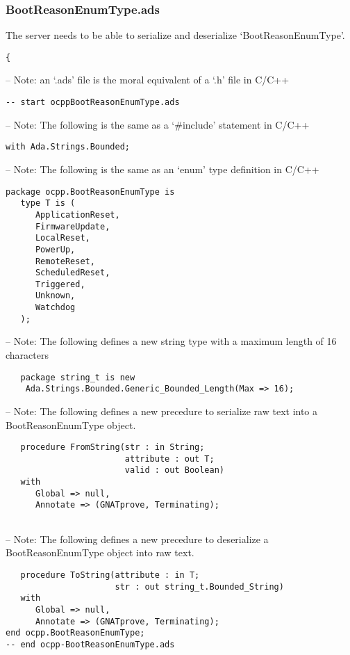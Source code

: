 \documentclass[12pt,openany,a4paper]{book}
\begin{document}
\subsubsection{BootReasonEnumType.ads}
The server needs to be able to serialize and deserialize `BootReasonEnumType'. 
\begin{verbatim}
{
\end{verbatim} 
-- Note: an `.ads' file is the moral equivalent of a `.h' file in C/C++
\begin{verbatim}
-- start ocppBootReasonEnumType.ads
\end{verbatim} 
-- Note: The following is the same as a `\#include' statement in C/C++
\begin{verbatim}
with Ada.Strings.Bounded;

\end{verbatim} 
-- Note: The following is the same as an `enum' type definition in C/C++
\begin{verbatim}
package ocpp.BootReasonEnumType is
   type T is (
      ApplicationReset,
      FirmwareUpdate,
      LocalReset,
      PowerUp,
      RemoteReset,
      ScheduledReset,
      Triggered,
      Unknown,
      Watchdog
   );

\end{verbatim} 
-- Note: The following defines a new string type with a maximum length of 16 characters
\begin{verbatim}
   package string_t is new 
   	Ada.Strings.Bounded.Generic_Bounded_Length(Max => 16);
\end{verbatim} 
-- Note: The following defines a new precedure to serialize raw text into a BootReasonEnumType object.
\begin{verbatim}
   procedure FromString(str : in String;
                        attribute : out T;
                        valid : out Boolean)
   with
      Global => null,
      Annotate => (GNATprove, Terminating);
 
\end{verbatim} 
-- Note: The following defines a new precedure to deserialize a BootReasonEnumType object into raw text.
\begin{verbatim}
   procedure ToString(attribute : in T;
                      str : out string_t.Bounded_String)
   with
      Global => null,
      Annotate => (GNATprove, Terminating);
end ocpp.BootReasonEnumType;
-- end ocpp-BootReasonEnumType.ads
\end{verbatim}
\end{document}
